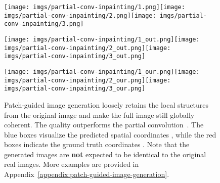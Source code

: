 \documentclass{article}
\begin{document}
        \begin{figure}[t]
            \centering
            \parbox[b]{.075\linewidth}{}\texttt{[image: imgs/partial-conv-inpainting/1.png]}\hspace{0.2em}\texttt{[image: imgs/partial-conv-inpainting/2.png]}\hspace{0.2em}\texttt{[image: imgs/partial-conv-inpainting/3.png]}
            
            \vspace{0.1em}
            
            \parbox[b]{.075\linewidth}{}\texttt{[image: imgs/partial-conv-inpainting/1\_out.png]}\hspace{0.2em}\texttt{[image: imgs/partial-conv-inpainting/2\_out.png]}\hspace{0.2em}\texttt{[image: imgs/partial-conv-inpainting/3\_out.png]}
            
            \vspace{0.1em}
            
            \parbox[b]{.075\linewidth}{}\texttt{[image: imgs/partial-conv-inpainting/1\_our.png]}\hspace{0.2em}\texttt{[image: imgs/partial-conv-inpainting/2\_our.png]}\hspace{0.2em}\texttt{[image: imgs/partial-conv-inpainting/3\_our.png]}
            
            \caption{Patch-guided image generation loosely retains the local structures from the original image and make the full image still globally coherent. The quality outperforms the partial convolution~\cite{partial-conv}. The {\color{blue} blue} boxes visualize the predicted spatial coordinates , while the {\color{red} red} boxes indicate the ground truth coordinates . Note that the generated images are \textbf{not} expected to be identical to the original real images. More examples are provided in Appendix~\ref{appendix:patch-guided-image-generation}.}
            \label{fig:patch-guided-image-generation}
\end{figure}
        
\end{document}
